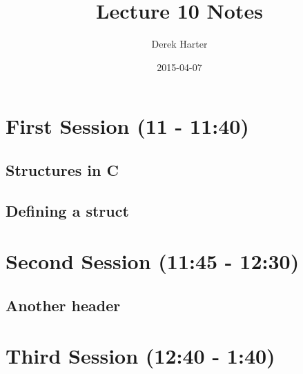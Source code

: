 \documentclass[11pt]{article}
\title{Lecture 10 Notes}
\author{Derek Harter}
\date{2015-04-07}
\begin{document}
\maketitle


\section{First Session (11 - 11:40)}
\label{sec-1}
\subsection{Structures in C}
\label{sec-1-1}
\subsection{Defining a struct}
\label{sec-1-2}
\section{Second Session (11:45 - 12:30)}
\label{sec-2}
\subsection{Another header}
\label{sec-2-1}
\section{Third Session (12:40 - 1:40)}
\label{sec-3}
\end{document}
